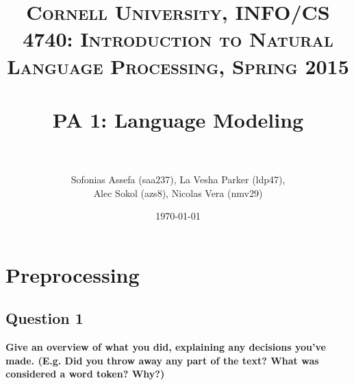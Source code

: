 \documentclass{article} %
\title{	
\normalfont \normalsize 
\textsc{Cornell University, INFO/CS 4740: Introduction to Natural Language Processing, Spring 2015} \\
\horrule{0.5pt} \\[0.4cm] %
\huge PA 1: Language Modeling \\ %
\horrule{2pt} \\[0.5cm] %
}
\author{Sofonias Assefa (saa237), La Vesha Parker (ldp47),\\
Alec Sokol (azs8), Nicolas Vera (nmv29)}
\date{\normalsize\today} %
\begin{document}
\maketitle %

\section{Preprocessing}
\subsection*{Question 1}

\textbf{Give an overview of what you did, explaining any decisions you've made. (E.g. Did you throw away any part of the text? What was considered a word token? Why?)}
\\
\end{document}
